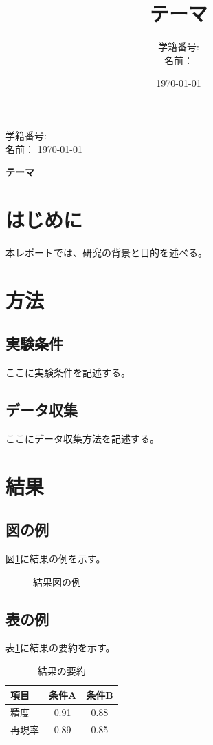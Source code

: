\documentclass[uplatex,a4paper,12pt]{jsarticle}
\title{テーマ}
\author{学籍番号: \shownstudentnumber\\
名前：\shownstudentname}
\date{\today}
\newif\ifredactpersonalinfo
\newcommand{\studentnumber}{\texttt{6930\mbox{-}38\mbox{-}5047}}
\newcommand{\studentname}{程 ヨウ}
\newcommand{\redact}[1]{\colorbox{black}{\rule{0pt}{1.2em}\rule{#1}{0pt}}}
\newcommand{\maybeRedact}[2]{\ifredactpersonalinfo\redact{#1}\else #2\fi}
\newcommand{\shownstudentnumber}{\maybeRedact{34mm}{\studentnumber}}
\newcommand{\shownstudentname}{\maybeRedact{25mm}{\studentname}}
\begin{document}
\begin{flushright}
学籍番号: \shownstudentnumber\\
名前：\shownstudentname\quad
\today
\end{flushright}

\begin{center}
{\LARGE\bfseries テーマ\par}
\end{center}


\section{はじめに}
本レポートでは、研究の背景と目的を述べる。

\section{方法}
\subsection{実験条件}
ここに実験条件を記述する。

\subsection{データ収集}
ここにデータ収集方法を記述する。

\section{結果}
\subsection{図の例}
図\ref{fig:example}に結果の例を示す。

\begin{figure}[htbp]
  \centering
  \fbox{\rule{0pt}{40mm}\rule{0.7\textwidth}{0pt}}
  \caption{結果図の例}
  \label{fig:example}
\end{figure}

\subsection{表の例}
表\ref{tab:example}に結果の要約を示す。

\begin{table}[htbp]
  \centering
  \caption{結果の要約}
  \label{tab:example}
  \begin{tabular}{lcc}
    \toprule
    項目 & 条件A & 条件B \\
    \midrule
    精度 & 0.91 & 0.88 \\
    再現率 & 0.89 & 0.85 \\
    \bottomrule
  \end{tabular}
\end{table}
\end{document}
